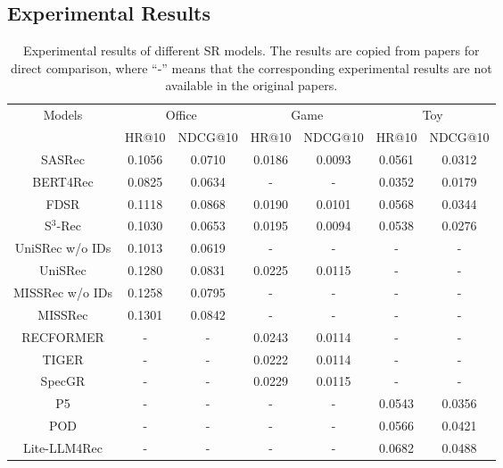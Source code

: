 \documentclass[review]{fcs}
\begin{document}
	\subsection{Experimental Results}
	\begin{table}[htbp]
		\caption{Experimental results of different SR models. The results are copied from papers \cite{MISSRec,SpecGR,Lite-LLM4Rec} for direct comparison, where  “-” means that the corresponding experimental results are not available in the original papers.}
		\centering
		\label{tab:experiment_results}%
		
		\begin{tabular}{ccccccc}
			\hline \multirow{2}{*}{Models} & \multicolumn{2}{c}{Office} & \multicolumn{2}{c}{Game} & \multicolumn{2}{c}{Toy}  \\		
			\cmidrule(lr){2-3} \cmidrule(lr){4-5} \cmidrule(lr){6-7} 	
			& \multicolumn{1}{l}{HR@10} & \multicolumn{1}{l}{NDCG@10} & \multicolumn{1}{l}{HR@10} & \multicolumn{1}{l}{NDCG@10} & \multicolumn{1}{l}{HR@10} & \multicolumn{1}{l}{NDCG@10} \\
			\hline
			SASRec & 0.1056 & 0.0710 & 0.0186 & 0.0093 & 0.0561 & 0.0312 \\
			BERT4Rec & 0.0825 & 0.0634 & -     & -     & 0.0352 & 0.0179 \\
			\hline
			FDSR  & 0.1118 & 0.0868 & 0.0190 & 0.0101 & 0.0568 & 0.0344 \\
			S$^{3}$-Rec & 0.1030 & 0.0653 & 0.0195 & 0.0094 & 0.0538 & 0.0276 \\
			\hline
			UniSRec w/o IDs & 0.1013 & 0.0619 & -     & -     & - & - \\
			UniSRec & 0.1280 & 0.0831 & 0.0225 & 0.0115 & - & - \\
			MISSRec w/o IDs & 0.1258 & 0.0795 & -     & -     & - & - \\
			MISSRec & 0.1301 & 0.0842 & -     & -     & - & - \\
			RECFORMER & -     &  -    & 0.0243 & 0.0114 & - & - \\
			\hline
			TIGER & -     &  -    & 0.0222 & 0.0114 & - & - \\
			SpecGR & -     &  -    & 0.0229 & 0.0115 & - & - \\
			\hline
			P5    & -     &  -    & -     & -     & 0.0543 & 0.0356 \\
			POD   & -     &  -    & -     & -     & 0.0566 & 0.0421 \\
			Lite-LLM4Rec & -     &  -    & -     & -     & 0.0682 & 0.0488 \\
			\hline
		\end{tabular}%
	\end{table}
	
\end{document}
